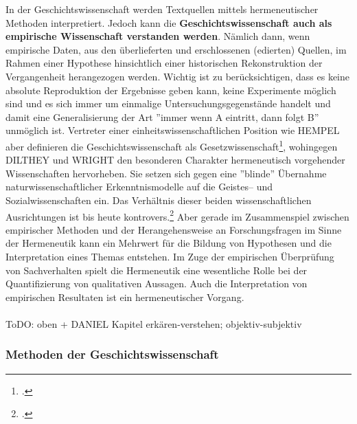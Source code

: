\documentclass[12pt,a4paper]{article}
\begin{document}
In der Geschichtswissenschaft werden Textquellen mittels hermeneutischer Methoden interpretiert. Jedoch kann die \textbf{Geschichtswissenschaft auch als empirische Wissenschaft verstanden werden}. Nämlich dann, wenn empirische Daten, aus den überlieferten und erschlossenen (edierten) Quellen, im Rahmen einer Hypothese hinsichtlich einer historischen Rekonstruktion der Vergangenheit herangezogen werden. Wichtig ist zu berücksichtigen, dass es keine absolute Reproduktion der Ergebnisse geben kann, keine Experimente möglich sind und es sich immer um einmalige Untersuchungsgegenstände handelt und damit eine Generalisierung der Art ''immer wenn A eintritt, dann folgt B'' unmöglich ist. Vertreter einer einheitswissenschaftlichen Position wie HEMPEL aber definieren die Geschichtswissenschaft als Gesetzwissenschaft\footcite[][S.79-80]{nussel2018offenbarung}, wohingegen DILTHEY und WRIGHT den besonderen Charakter hermeneutisch vorgehender Wissenschaften hervorheben. Sie setzen sich gegen eine ''blinde'' Übernahme naturwissenschaftlicher Erkenntnismodelle auf die Geistes-- und Sozialwissenschaften ein. Das Verhältnis dieser beiden wissenschaftlichen Ausrichtungen ist bis heute kontrovers.\footcite{wellmer1979georg} Aber gerade im Zusammenspiel zwischen empirischer Methoden und der Herangehensweise an Forschungsfragen im Sinne der Hermeneutik kann ein Mehrwert für die Bildung von Hypothesen und die Interpretation eines Themas entstehen. Im Zuge der empirischen Überprüfung von Sachverhalten spielt die Hermeneutik eine wesentliche Rolle bei der Quantifizierung von qualitativen Aussagen. Auch die Interpretation von empirischen Resultaten ist ein hermeneutischer Vorgang.
\\
\\
ToDO: oben + DANIEL Kapitel erkären-verstehen; objektiv-subjektiv

\subsubsection{Methoden der Geschichtswissenschaft}
\label{ref:Methoden}
\end{document}
